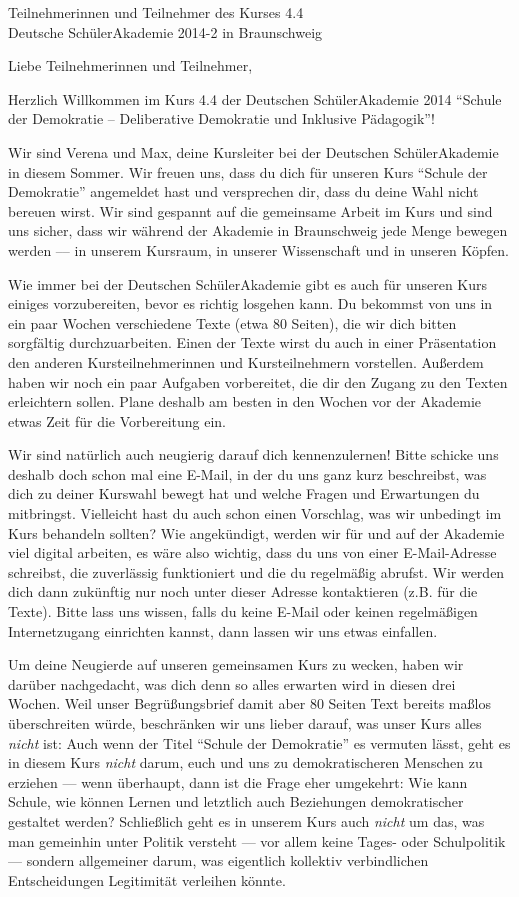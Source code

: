 \documentclass[a4paper]{letter}
\date{15.\ April 2014}
\begin{document}
\begin{letter}{
	Teilnehmerinnen und Teilnehmer des Kurses 4.4 \\
	Deutsche SchülerAkademie 2014-2 in Braunschweig}

\opening{Liebe Teilnehmerinnen und Teilnehmer,}

Herzlich Willkommen im Kurs 4.4 der Deutschen SchülerAkademie 2014 ``Schule der Demokratie -- Deliberative Demokratie und Inklusive Pädagogik''!

Wir sind Verena und Max, deine Kursleiter bei der Deutschen SchülerAkademie in diesem Sommer.
Wir freuen uns, dass du dich für unseren Kurs ``Schule der Demokratie'' angemeldet hast und versprechen dir, dass du deine Wahl nicht bereuen wirst.
Wir sind gespannt auf die gemeinsame Arbeit im Kurs und sind uns sicher, dass wir während der Akademie in Braunschweig jede Menge bewegen werden --– in unserem Kursraum, in unserer Wissenschaft und in unseren Köpfen.

Wie immer bei der Deutschen SchülerAkademie gibt es auch für unseren Kurs einiges vorzubereiten, bevor es richtig losgehen kann.
Du bekommst von uns in ein paar Wochen verschiedene Texte (etwa 80 Seiten), die wir dich bitten sorgfältig durchzuarbeiten.
Einen der Texte wirst du auch in einer Präsentation den anderen Kursteilnehmerinnen und Kursteilnehmern vorstellen.
Außerdem haben wir noch ein paar Aufgaben vorbereitet, die dir den Zugang zu den Texten erleichtern sollen.
Plane deshalb am besten in den Wochen vor der Akademie etwas Zeit für die Vorbereitung ein.

Wir sind natürlich auch neugierig darauf dich kennenzulernen!
Bitte schicke uns deshalb doch schon mal eine E-Mail, in der du uns ganz kurz beschreibst, was dich zu deiner Kurswahl bewegt hat und welche Fragen und Erwartungen du mitbringst.
Vielleicht hast du auch schon einen Vorschlag, was wir unbedingt im Kurs behandeln sollten?
Wie angekündigt, werden wir für und auf der Akademie viel digital arbeiten, es wäre also wichtig, dass du uns von einer E-Mail-Adresse schreibst, die zuverlässig funktioniert und die du regelmäßig abrufst.
Wir werden dich dann zukünftig nur noch unter dieser Adresse kontaktieren (z.B. für die Texte).
Bitte lass uns wissen, falls du keine E-Mail oder keinen regelmäßigen Internetzugang einrichten kannst, dann lassen wir uns etwas einfallen.

Um deine Neugierde auf unseren gemeinsamen Kurs zu wecken, haben wir darüber nachgedacht, was dich denn so alles erwarten wird in diesen drei Wochen.
Weil unser Begrüßungsbrief damit aber 80 Seiten Text bereits maßlos überschreiten würde, beschränken wir uns lieber darauf, was unser Kurs alles \emph{nicht} ist:
Auch wenn der Titel ``Schule der Demokratie'' es vermuten lässt, geht es in diesem Kurs \emph{nicht} darum, euch und uns zu demokratischeren Menschen zu erziehen --- wenn überhaupt, dann ist die Frage eher umgekehrt: Wie kann Schule, wie können Lernen und letztlich auch Beziehungen demokratischer gestaltet werden?
Schließlich geht es in unserem Kurs auch \emph{nicht} um das, was man gemeinhin unter Politik versteht --- vor allem keine Tages- oder Schulpolitik --- sondern allgemeiner darum, was eigentlich kollektiv verbindlichen Entscheidungen Legitimität verleihen könnte.


\end{letter}
\end{document}
